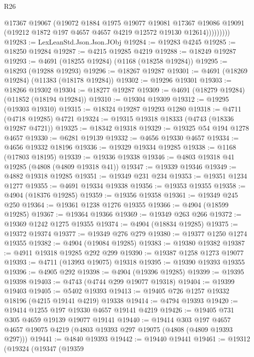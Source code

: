 \begin{lexlean}{R26}
\begin{coremodule}
                  @17367
                  @19067
                  (@19072
                    @1884
                    @1975
                    @19077
                    @19081
                    @17367
                    @19086
                    @19091
                    (@19212 @1872 @197 @4657 @4657 @4219 @12572 @19130 @12614)))))))))
@19283 := LexLeanStd.Json.Json.JObj
@19284 := @19283 @4245
@19285 := @18250 @19284
@19287 := @4215 @19285 @4219
@19288 := @18249 @19287
@19293 := @4691 (@18255 @19284) (@1168 (@18258 @19284))
@19295 := @18293 (@19288 @19293)
@19296 := @18267 @19287
@19301 := @4691 (@18269 @19284) (@11383 (@18178 @19284))
@19302 := @19296 @19301
@19303 := @18266 @19302
@19304 := @18277 @19287
@19309 := @4691 (@18279 @19284) (@11852 (@18194 @19284))
@19310 := @19304 @19309
@19312 := @19295 (@19303 @19310)
@19315 := @18324 @19287 @19293 @1280
@19318 := @4711 (@4718 @19285) @4721
@19324 := @19315 @19318 @18333 (@4743 (@18336 @19287 @4721))
@19325 := @18342 @19318
@19329 := @19325 @54 @194 @1278 @4657
@19330 := @6281 @19139
@19332 := @4656 @19330 @4657
@19334 := @4656 @19332 @18196
@19336 := @19329 @19334 @19285
@19338 := @1168 (@17803 @18195)
@19339 := @19336 @19338
@19346 := @4803 @19318 @41 @19285 (@4808 (@4809 @19318 @41))
@19347 := @19339 @19346
@19349 := @4882 @19318 @19285
@19351 := @19349 @231 @234
@19353 := @19351 @1234 @1277
@19355 := @4691 @19334 @19338
@19356 := @19353 @19355
@19358 := @4904 (@18376 @19285)
@19359 := @19356 @19358
@19361 := @19349 @245 @250
@19364 := @19361 @1238 @1276 @19355
@19366 := @4904 (@18599 @19285)
@19367 := @19364 @19366
@19369 := @19349 @263 @266
@19372 := @19369 @1242 @1275 @19355
@19374 := @4904 (@18834 @19285)
@19375 := @19372 @19374
@19377 := @19349 @276 @279
@19380 := @19377 @1250 @1274 @19355
@19382 := @4904 (@19084 @19285)
@19383 := @19380 @19382
@19387 := @4911 @19318 @19285 @292 @299
@19390 := @19387 @1258 @1273 @19077
@19393 := @4711 (@13993 @19075) @19318
@19395 := @19390 @19393 @19355
@19396 := @4905 @292
@19398 := @4904 (@19396 @19285)
@19399 := @19395 @19398
@19403 := @4743 (@4744 @299 @19077 @19318)
@19404 := @19399 @19403
@19405 := @5402 @19393
@19413 := @19405 @726 @1257 @19332 @18196 (@4215 @19141 @4219) @19338
@19414 := @4794 @19393
@19420 := @19414 @1255 @197 @19330 @4657 @19141 @4219
@19426 := @19405 @731 @305 @4659 @19139 @19077 @19141
@19440 := @19414
    @303
    @197
    @4657
    @4657
    @19075
    @4219
    (@4803 @19393 @297 @19075 (@4808 (@4809 @19393 @297)))
@19441 := @4840 @19393
@19442 := @19440 @19441
@19461 := @19312
    (@19324
      (@19347
        (@19359

\end{coremodule}
\end{lexlean}
